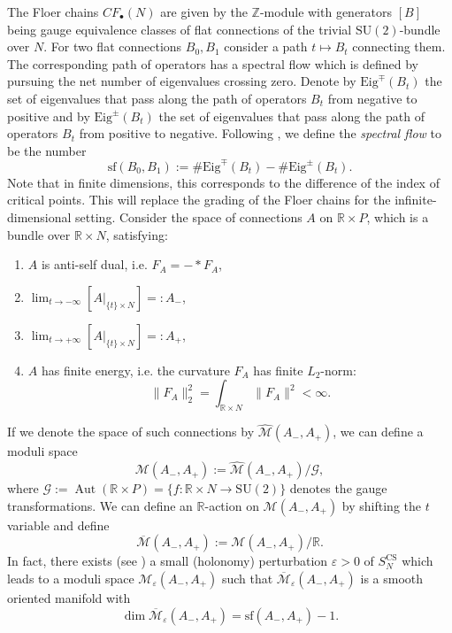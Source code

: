 \documentclass[11pt,colorinlistoftodos]{amsart}
\numberwithin{equation}{subsection}
\theoremstyle{plain}
\theoremstyle{definition}
\theoremstyle{remark}
\newcommand{\R}{\mathbb{R}}
\newcommand{\Z}{\mathbb{Z}}
\DeclareMathOperator{\Aut}{Aut}
\newcommand{\calM}{\mathcal{M}}
\begin{document}
The Floer chains $CF_\bullet(N)$ are given by the $\Z$-module with generators $[B]$ being gauge equivalence classes of flat connections of the trivial $\mathrm{SU}(2)$-bundle over $N$. For two flat connections $B_0,B_1$ consider a path $t\mapsto B_t$ connecting them. The corresponding path of operators has a spectral flow which is defined by pursuing the net number of eigenvalues crossing zero. Denote by $\mathrm{Eig}^{\mp}(B_t)$ the set of eigenvalues that pass along the path of operators $B_t$ from negative to positive and by $\mathrm{Eig}^{\pm}(B_t)$ the set of eigenvalues that pass along the path of operators $B_t$ from positive to negative.
Following \cite{AtiyahPatodiSinger75-76}, we define the \emph{spectral flow} to be the number
\begin{equation}
\mathrm{sf}(B_0,B_1):=\#\mathrm{Eig}^\mp(B_t)-\#\mathrm{Eig}^\pm(B_t).
\end{equation}
Note that in finite dimensions, this corresponds to the difference of the index of critical points. This will replace the grading of the Floer chains for the infinite-dimensional setting.
Consider the space of connections $A$ on $\R\times P$, which is a bundle over $\R\times N$, satisfying:
\begin{enumerate}
    \item $A$ is anti-self dual, i.e. $F_A=-*F_A$,
    \item $\lim_{t\to -\infty}[A\vert_{\{t\}\times N}]=:A_-$,
    \item $\lim_{t\to +\infty}[A\vert_{\{t\}\times N}]=:A_+$,
    \item $A$ has finite energy, i.e. the curvature $F_A$ has finite $L_2$-norm:
    \[
    \|F_A\|_2^2=\int_{\R\times N} \|F_A\|^2<\infty.
    \]
\end{enumerate}
If we denote the space of such connections by $\widehat{\calM}(A_-,A_+)$, we can define a moduli space 
\[
\calM(A_-,A_+):=\widehat{\calM}(A_-,A_+)/\mathcal{G},
\]
where $\mathcal{G}:=\Aut(\R\times P)=\{f\colon \R\times N\to \mathrm{SU}(2)\}$ denotes the gauge transformations. We can define an $\R$-action on $\calM(A_-,A_+)$ by shifting the $t$ variable and define 
\[
\overline{\calM}(A_-,A_+):=\calM(A_-,A_+)/\R.
\]
In fact, there exists (see \cite{Floer1988,Donaldson2002,Saveliev2001}) a small (holonomy) perturbation $\varepsilon>0$ of $S^\mathrm{CS}_{N}$ which leads to a moduli space $\calM_\varepsilon(A_-,A_+)$ such that $\overline{\calM}_\varepsilon(A_-,A_+)$ is a smooth oriented manifold with 
\[
\dim \overline{\calM}_\varepsilon(A_-,A_+)=\mathrm{sf}(A_-,A_+)-1.
\]
\end{document}

